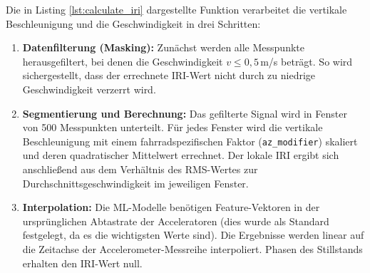 Die in Listing \ref{lst:calculate_iri} dargestellte Funktion verarbeitet die vertikale Beschleunigung und die Geschwindigkeit in drei Schritten:
\begin{enumerate}
    \item \textbf{Datenfilterung (Masking):} Zunächst werden alle Messpunkte herausgefiltert, bei denen die Geschwindigkeit $v \le 0{,}5$\,m/s beträgt. So wird sichergestellt, dass der errechnete IRI-Wert nicht durch zu niedrige Geschwindigkeit verzerrt wird.
    \item \textbf{Segmentierung und Berechnung:} Das gefilterte Signal wird in Fenster von 500 Messpunkten unterteilt. Für jedes Fenster wird die vertikale Beschleunigung mit einem fahrradspezifischen Faktor (\texttt{az\_modifier}) skaliert und deren quadratischer Mittelwert errechnet. Der lokale IRI ergibt sich anschließend aus dem Verhältnis des RMS-Wertes zur Durchschnittsgeschwindigkeit im jeweiligen Fenster.
    \item \textbf{Interpolation:} Die ML-Modelle benötigen Feature-Vektoren in der ursprünglichen Abtastrate der Acceleratoren (dies wurde als Standard festgelegt, da es die wichtigsten Werte sind). Die Ergebnisse werden linear auf die Zeitachse der Accelerometer-Messreihe interpoliert. Phasen des Stillstands erhalten den IRI-Wert null.
\end{enumerate}